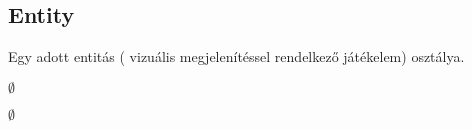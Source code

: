 \subsection{Entity}
\begin{class-template-responsibility}
Egy adott entitás ( vizuális megjelenítéssel rendelkező játékelem) osztálya. 
\end{class-template-responsibility}
\begin{class-template-interface}
$\emptyset$
\end{class-template-interface}
\begin{class-template-baseclass}
$\emptyset$
\end{class-template-baseclass}
\begin{class-template-attribute}
\end{class-template-attribute}
\begin{class-template-method}
\end{class-template-method}


